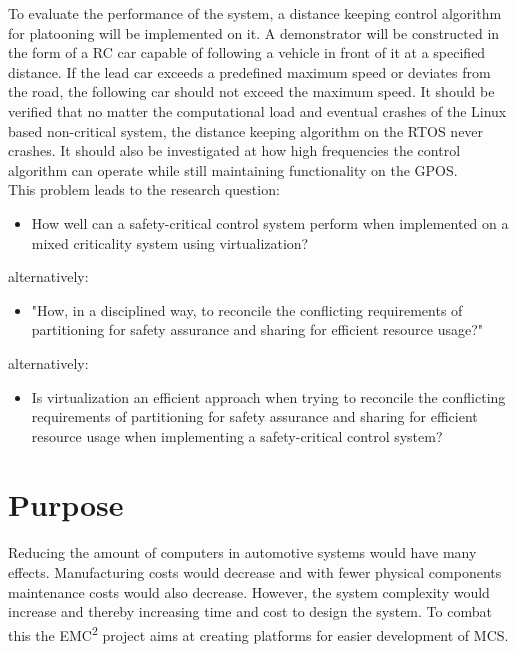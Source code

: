 To evaluate the performance of the system, a distance keeping control algorithm for platooning will be implemented on it. A demonstrator will be constructed in the form of a RC car capable of following a vehicle in front of it at a specified distance. If the lead car exceeds a predefined maximum speed or deviates from the road, the following car should not exceed the maximum speed. It should be verified that no matter the computational load and eventual crashes of the Linux based non-critical system, the distance keeping algorithm on the RTOS never crashes. It should also be investigated at how high frequencies the control algorithm can operate while still maintaining functionality on the GPOS. \\

This problem leads to the research question: 
\begin{itemize}
\item How well can a safety-critical control system perform when implemented on a mixed criticality system using virtualization?
\end{itemize}
alternatively:
\begin{itemize}
\item "How, in a disciplined way, to reconcile the conflicting requirements of partitioning for safety assurance and sharing for efficient resource usage?" \cite{burns2016}
\end{itemize}
alternatively:
\begin{itemize}
\item Is virtualization an efficient approach when trying to reconcile the conflicting requirements of partitioning for safety assurance and sharing for efficient resource usage when implementing a safety-critical control system?
\end{itemize}

\section{Purpose}
Reducing the amount of computers in automotive systems would have many effects. Manufacturing costs would decrease and with fewer physical components maintenance costs would also decrease. However, the system complexity would increase and thereby increasing time and cost to design the system. To combat this the EMC\textsuperscript{2} project aims at creating platforms for easier development of MCS. %

